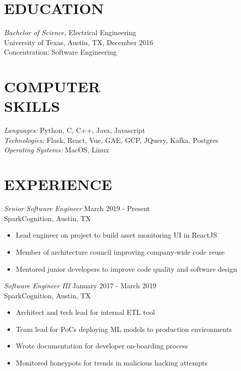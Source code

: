 \documentclass[margin,10pt]{res}
\begin{document}
\address{philliplemons512@gmail.com
      \\ www.philliplemons.com}

\begin{resume}

\section{EDUCATION} {\sl Bachelor of Science,} Electrical Engineering \\
                University of Texas, Austin, TX,
                December 2016 \\
                Concentration: Software Engineering

\section{COMPUTER \\ SKILLS} {\sl Languages:} Python, C, C++, Java,
                Javascript \\
                {\sl Technologies:} Flask, React, Vue, GAE, GCP, JQuery, Kafka, Postgres \\
                {\sl Operating Systems:} MacOS, Linux

\section{EXPERIENCE}
    {\sl Senior Software Engineer } \hfill      March 2019 - Present \\
    SparkCognition, Austin, TX
    \begin{itemize} \itemsep -2pt %
        \item Lead engineer on project to build asset monitoring UI in ReactJS
        \item Member of architecture council improving company-wide code reuse
        \item Mentored junior developers to improve code quality and software design
    \end{itemize}

    {\sl Software Engineer III} \hfill         January 2017 - March 2019 \\
    SparkCognition, Austin, TX
    \begin{itemize} \itemsep -2pt %
        \item Architect and tech lead for internal ETL tool
        \item Team lead for PoCs deploying ML models to production environments
        \item Wrote documentation for developer on-boarding process
        \item Monitored honeypots for trends in malicious hacking attempts
    \end{itemize}


\end{resume}
\end{document}
